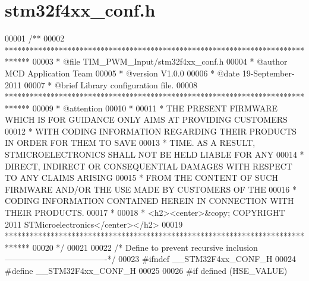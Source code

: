 \section{stm32f4xx\+\_\+conf.\+h}
\label{stm32f4xx__conf_8h_source}

\begin{DoxyCode}
00001 \textcolor{comment}{/**}
00002 \textcolor{comment}{  ******************************************************************************}
00003 \textcolor{comment}{  * @file    TIM\_PWM\_Input/stm32f4xx\_conf.h  }
00004 \textcolor{comment}{  * @author  MCD Application Team}
00005 \textcolor{comment}{  * @version V1.0.0}
00006 \textcolor{comment}{  * @date    19-September-2011}
00007 \textcolor{comment}{  * @brief   Library configuration file.}
00008 \textcolor{comment}{  ******************************************************************************}
00009 \textcolor{comment}{  * @attention}
00010 \textcolor{comment}{  *}
00011 \textcolor{comment}{  * THE PRESENT FIRMWARE WHICH IS FOR GUIDANCE ONLY AIMS AT PROVIDING CUSTOMERS}
00012 \textcolor{comment}{  * WITH CODING INFORMATION REGARDING THEIR PRODUCTS IN ORDER FOR THEM TO SAVE}
00013 \textcolor{comment}{  * TIME. AS A RESULT, STMICROELECTRONICS SHALL NOT BE HELD LIABLE FOR ANY}
00014 \textcolor{comment}{  * DIRECT, INDIRECT OR CONSEQUENTIAL DAMAGES WITH RESPECT TO ANY CLAIMS ARISING}
00015 \textcolor{comment}{  * FROM THE CONTENT OF SUCH FIRMWARE AND/OR THE USE MADE BY CUSTOMERS OF THE}
00016 \textcolor{comment}{  * CODING INFORMATION CONTAINED HEREIN IN CONNECTION WITH THEIR PRODUCTS.}
00017 \textcolor{comment}{  *}
00018 \textcolor{comment}{  * <h2><center>&copy; COPYRIGHT 2011 STMicroelectronics</center></h2>}
00019 \textcolor{comment}{  ******************************************************************************}
00020 \textcolor{comment}{  */}
00021 
00022 \textcolor{comment}{/* Define to prevent recursive inclusion -------------------------------------*/}
00023 \textcolor{preprocessor}{#}\textcolor{preprocessor}{ifndef} \textcolor{preprocessor}{\_\_STM32F4xx\_CONF\_H}
00024 \textcolor{preprocessor}{#}\textcolor{preprocessor}{define} \textcolor{preprocessor}{\_\_STM32F4xx\_CONF\_H}
00025 
00026 \textcolor{preprocessor}{#}\textcolor{preprocessor}{if} \textcolor{preprocessor}{defined}  \textcolor{preprocessor}{(}\textcolor{preprocessor}{HSE\_VALUE}\textcolor{preprocessor}{)}

\end{DoxyCode}
